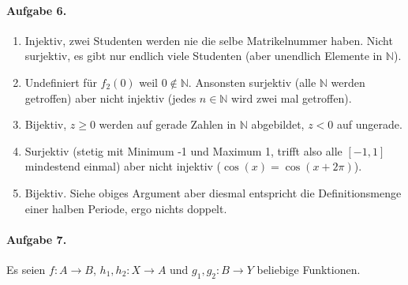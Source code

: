 \documentclass{article}
\begin{document}
\paragraph{Aufgabe 6.} \begin{enumerate}
    \item Injektiv, zwei Studenten werden nie die selbe Matrikelnummer haben. Nicht surjektiv, es gibt nur endlich viele Studenten (aber unendlich Elemente in $\mathbb{N}$).
    \item Undefiniert für $f_2(0)$ weil $0 \not\in \mathbb{N}$. Ansonsten surjektiv (alle $\mathbb{N}$ werden getroffen) aber nicht injektiv (jedes $n \in \mathbb{N}$ wird zwei mal getroffen).
    \item Bijektiv, $z \geq 0$ werden auf gerade Zahlen in $\mathbb{N}$ abgebildet, $z < 0$ auf ungerade.
    \item Surjektiv (stetig mit Minimum -1 und Maximum 1, trifft also alle $[-1, 1]$ mindestend einmal) aber nicht injektiv ($\cos(x) = \cos(x + 2\pi)$).
    \item Bijektiv. Siehe obiges Argument aber diesmal entspricht die Definitionsmenge einer halben Periode, ergo nichts doppelt.
\end{enumerate}

\paragraph{Aufgabe 7.}

Es seien $f: A \rightarrow B$, $h_1, h_2: X \rightarrow A$ und $g_1, g_2: B \rightarrow Y$ beliebige Funktionen.
\end{document}

